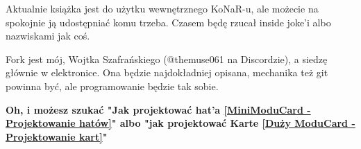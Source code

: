\documentclass[b5paper, 10pt, twoside]{book}
\newcommand{\mcsbox}[2][Note]{%
  \vspace{6pt}%
  \noindent
  \begin{tikzpicture}
    \node[inner sep=7pt, text width=\dimexpr\linewidth-14pt] (txt)
      {\footnotesize\rmfamily\textbf{#1:} #2};
    \draw[hand, line width=1pt, inkBlack]
      (txt.north west) rectangle (txt.south east);
  \end{tikzpicture}%
  \vspace{4pt}%
}
\newcommand{\mcs}{\textsf{\textbf{MCS\,3}}}
\newcommand{\mcsfull}{ModuCard System~3}
\begin{document}
Aktualnie książka jest do użytku wewnętrznego KoNaR-u, ale możecie na spokojnie ją udostępniać komu trzeba. Czasem będę rzucał inside joke'i albo nazwiskami jak coś.

Fork jest mój, Wojtka Szafrańskiego (@themuse061 na Discordzie), a siedzę głównie w elektronice. Ona będzie najdokładniej opisana, mechanika też git powinna być, ale programowanie będzie tak sobie.

\textbf{Oh, i możesz szukać "Jak projektować hat'a \ref{MiniModuCard - Projektowanie hatów}"  albo "jak projektować Karte \ref{Duży ModuCard - Projektowanie kart}"}









\end{document}
